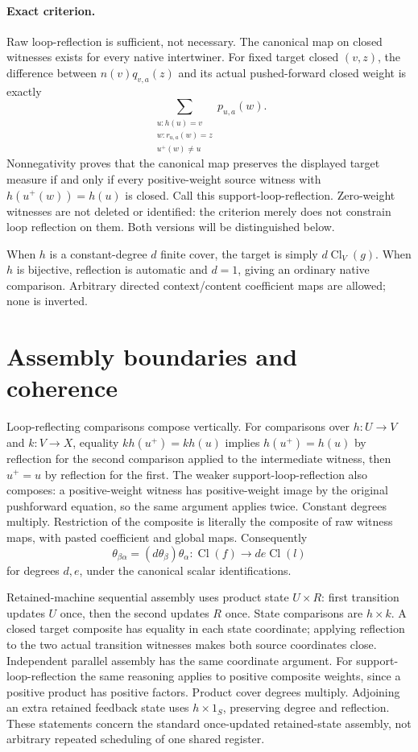 \documentclass{article}
\begin{document}
\paragraph{Exact criterion.} Raw loop-reflection is sufficient, not necessary. The canonical map on closed witnesses exists for every native intertwiner. For fixed target closed $(v,z)$, the difference between $n(v)q_{v,a}(z)$ and its actual pushed-forward closed weight is exactly
\[
 \sum_{\substack{u:h(u)=v\\w:r_{u,a}(w)=z\\u^+(w)\ne u}}p_{u,a}(w).
\]
Nonnegativity proves that the canonical map preserves the displayed target measure if and only if every positive-weight source witness with $h(u^+(w))=h(u)$ is closed. Call this support-loop-reflection. Zero-weight witnesses are not deleted or identified: the criterion merely does not constrain loop reflection on them. Both versions will be distinguished below.

When $h$ is a constant-degree $d$ finite cover, the target is simply $d\operatorname{Cl}_V(g)$. When $h$ is bijective, reflection is automatic and $d=1$, giving an ordinary native comparison. Arbitrary directed context/content coefficient maps are allowed; none is inverted.
\section{Assembly boundaries and coherence}
Loop-reflecting comparisons compose vertically. For comparisons over $h:U\to V$ and $k:V\to X$, equality $kh(u^+)=kh(u)$ implies $h(u^+)=h(u)$ by reflection for the second comparison applied to the intermediate witness, then $u^+=u$ by reflection for the first. The weaker support-loop-reflection also composes: a positive-weight witness has positive-weight image by the original pushforward equation, so the same argument applies twice. Constant degrees multiply. Restriction of the composite is literally the composite of raw witness maps, with pasted coefficient and global maps. Consequently
\[\theta_{\beta\alpha}=(d\theta_\beta)\theta_\alpha:
\operatorname{Cl}(f)\to de\operatorname{Cl}(l)\]
for degrees $d,e$, under the canonical scalar identifications.

Retained-machine sequential assembly uses product state $U\times R$: first transition updates $U$ once, then the second updates $R$ once. State comparisons are $h\times k$. A closed target composite has equality in each state coordinate; applying reflection to the two actual transition witnesses makes both source coordinates close. Independent parallel assembly has the same coordinate argument. For support-loop-reflection the same reasoning applies to positive composite weights, since a positive product has positive factors. Product cover degrees multiply. Adjoining an extra retained feedback state uses $h\times1_S$, preserving degree and reflection. These statements concern the standard once-updated retained-state assembly, not arbitrary repeated scheduling of one shared register.
\end{document}
